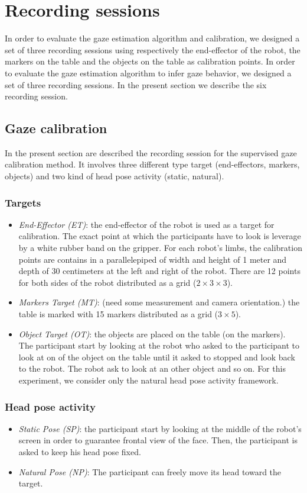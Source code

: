 \documentclass[11pt,a4paper]{article}
\begin{document}
\section{Recording sessions}
In order to evaluate the gaze estimation algorithm and calibration, we designed a set of three recording sessions using respectively the end-effector of the robot, the markers on the table and the objects on the table as calibration points. In order to evaluate the gaze estimation algorithm to infer gaze behavior, we designed a set of three recording sessions. In the present section we describe the six recording session.
\subsection{Gaze calibration}
In the present section are described the recording session for the supervised gaze calibration method. It involves three different type target (end-effectors, markers, objects) and two kind of head pose activity (static, natural).
\subsubsection{Targets}
\begin{itemize}
\item \textit{End-Effector (ET)}: the end-effector of the robot is used as a target for calibration. The exact point at which the participants have to look is leverage by a white rubber band on the gripper. For each robot's limbs, the calibration points are contains in a parallelepiped of width and height of 1 meter and depth of 30 centimeters at the left and right of the robot. There are 12 points for both sides of the robot distributed as a grid ($2 \times 3 \times 3$).
\item \textit{Markers Target (MT)}: (need some measurement and camera orientation.) the table is marked with 15 markers distributed as a grid ($3 \times 5$).
\item \textit{Object Target (OT)}: the objects are placed on the table (on the markers). The participant start by looking at the robot who asked to the participant to look at on of the object on the table until it asked to stopped and look back to the robot. The robot ask to look at an other object and so on. For this experiment, we consider only the natural head pose activity framework.
\end{itemize}
\subsubsection{Head pose activity}
\begin{itemize}
\item \textit{Static Pose (SP)}: the participant start by looking at the middle of the robot's screen in order to guarantee frontal view of the face. Then, the participant is asked to keep his head pose fixed.
\item \textit{Natural Pose (NP)}: The participant can freely move its head toward the target.
\end{itemize}
\end{document}
